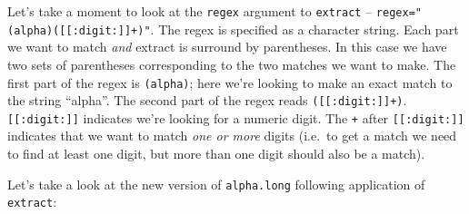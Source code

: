 \documentclass[]{book}
\newenvironment{Shaded}{\begin{snugshade}}{\end{snugshade}}
\newcommand{\AlertTok}[1]{\textcolor[rgb]{0.94,0.16,0.16}{#1}}
\newcommand{\CommentTok}[1]{\textcolor[rgb]{0.56,0.35,0.01}{\textit{#1}}}
\newcommand{\DataTypeTok}[1]{\textcolor[rgb]{0.13,0.29,0.53}{#1}}
\newcommand{\KeywordTok}[1]{\textcolor[rgb]{0.13,0.29,0.53}{\textbf{#1}}}
\newcommand{\NormalTok}[1]{#1}
\newcommand{\OperatorTok}[1]{\textcolor[rgb]{0.81,0.36,0.00}{\textbf{#1}}}
\newcommand{\OtherTok}[1]{\textcolor[rgb]{0.56,0.35,0.01}{#1}}
\newcommand{\StringTok}[1]{\textcolor[rgb]{0.31,0.60,0.02}{#1}}
\theoremstyle{definition}
\theoremstyle{definition}
\theoremstyle{definition}
\theoremstyle{remark}
\begin{document}
\begin{Shaded}
\end{Shaded}

Let's take a moment to look at the \texttt{regex} argument to
\texttt{extract} -- \texttt{regex="(alpha)({[}{[}:digit:{]}{]}+)"}. The
regex is specified as a character string. Each part we want to match
\emph{and} extract is surround by parentheses. In this case we have two
sets of parentheses corresponding to the two matches we want to make.
The first part of the regex is \texttt{(alpha)}; here we're looking to
make an exact match to the string ``alpha''. The second part of the
regex reads \texttt{({[}{[}:digit:{]}{]}+)}.
\texttt{{[}{[}:digit:{]}{]}} indicates we're looking for a numeric
digit. The \texttt{+} after \texttt{{[}{[}:digit:{]}{]}} indicates that
we want to match \emph{one or more} digits (i.e.~to get a match we need
to find at least one digit, but more than one digit should also be a
match).

Let's take a look at the new version of \texttt{alpha.long} following
application of \texttt{extract}:
\end{document}
